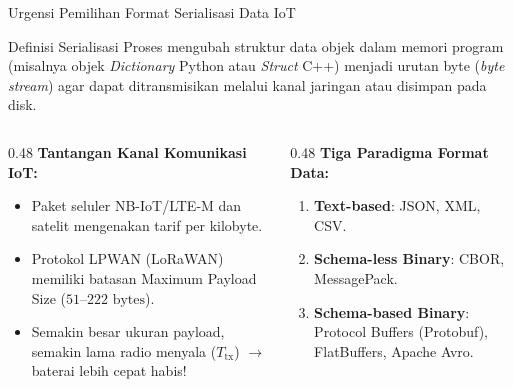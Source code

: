 \documentclass[aspectratio=169,10pt]{beamer}
\begin{document}
\begin{frame}{Urgensi Pemilihan Format Serialisasi Data IoT}
    \begin{block}{Definisi Serialisasi}
        Proses mengubah struktur data objek dalam memori program (misalnya objek \textit{Dictionary} Python atau \textit{Struct} C++) menjadi urutan byte (\textit{byte stream}) agar dapat ditransmisikan melalui kanal jaringan atau disimpan pada disk.
    \end{block}
    \vspace{4pt}
    \begin{columns}[T]
        \begin{column}{0.48\textwidth}
            \textbf{Tantangan Kanal Komunikasi IoT:}
            \begin{itemize}
                \item Paket seluler NB-IoT/LTE-M dan satelit mengenakan tarif per kilobyte.
                \item Protokol LPWAN (LoRaWAN) memiliki batasan Maximum Payload Size ($51\text{--}222\text{ bytes}$).
                \item Semakin besar ukuran payload, semakin lama radio menyala ($T_{\text{tx}}$) $\to$ baterai lebih cepat habis!
            \end{itemize}
        \end{column}
        \begin{column}{0.48\textwidth}
            \textbf{Tiga Paradigma Format Data:}
            \begin{enumerate}
                \item \textbf{Text-based}: JSON, XML, CSV.
                \item \textbf{Schema-less Binary}: CBOR, MessagePack.
                \item \textbf{Schema-based Binary}: Protocol Buffers (Protobuf), FlatBuffers, Apache Avro.
            \end{enumerate}
        \end{column}
    \end{columns}
\end{frame}
\end{document}
